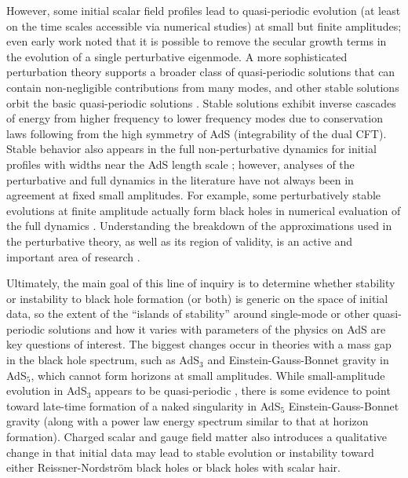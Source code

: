 \documentclass[../PhD.tex]{subfiles}
\begin{document}
However, some initial scalar field profiles lead to quasi-periodic evolution
(at least on the time scales accessible via numerical studies)
at small but finite amplitudes; even early work \cite{1104.3702,1109.1825}
noted that it is possible to remove the secular growth terms in the
evolution of a single perturbative eigenmode.  A more sophisticated
perturbation theory \cite{1403.6471,1407.6273,Basu:2014sia,1410.1880,1412.4761,1412.3249,Evnin:2015gma,1507.02684,1507.08261,1508.04943,1508.05474,1510.07836}
supports a broader class of quasi-periodic solutions that can contain
non-negligible contributions from many modes, and other stable solutions
orbit the basic quasi-periodic solutions \cite{1507.08261}.  Stable
solutions exhibit inverse cascades of energy from higher frequency to lower
frequency modes due to conservation laws following from the high symmetry
of AdS (integrability of the dual CFT).  Stable behavior also appears
in the full non-perturbative dynamics for initial profiles with widths near
the AdS length scale \cite{1304.4166,1307.2875,1308.1235}; however,
analyses of the perturbative and full dynamics in the literature have not
always been in agreement at fixed small amplitudes.  For example, some
perturbatively stable evolutions at finite amplitude actually form black holes
in numerical evaluation of the full dynamics
\cite{1403.6471,1410.2631,1506.07907}.  Understanding the breakdown of the
approximations used in the perturbative theory, as well as its region of
validity, is an active and important area of research
\cite{1506.03519,1606.02712,1607.08094,Dimitrakopoulos:2016euh,Liebling:2017gfn}.

Ultimately, the main goal of this line of inquiry is to determine whether
stability or instability to black hole formation (or both) is generic on
the space of initial data, so the extent of the ``islands of stability''
around single-mode or other quasi-periodic solutions and how it varies
with parameters of the physics on AdS are key questions of interest.  The
biggest changes occur in theories with a mass gap in the black hole spectrum,
such as AdS$_3$ and Einstein-Gauss-Bonnet gravity in AdS$_5$, which cannot
form horizons at small amplitudes.  While small-amplitude evolution in
AdS$_3$ appears to be quasi-periodic \cite{1306.0317,1412.6002}, there is
some evidence to point toward late-time formation of a naked singularity
in AdS$_5$ Einstein-Gauss-Bonnet gravity \cite{1608.05402,1410.1869}
(along with a power law energy spectrum similar to that at horizon
formation).  Charged scalar and gauge field matter \cite{1606.00830}
also introduces a qualitative change in that initial data may lead to
stable evolution or instability toward either Reissner-Nordstr\"om black holes
or black holes with scalar hair.
\end{document}
